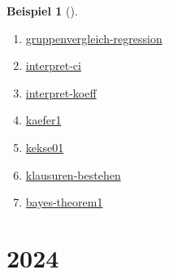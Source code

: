 \documentclass[
  ngerman,
  letterpaper,
  twoside,
  open=any]{scrbook}
\theoremstyle{definition}
\newtheorem{example}{Beispiel}[chapter]
\theoremstyle{plain}
\theoremstyle{definition}
\theoremstyle{definition}
\theoremstyle{remark}
\begin{document}
\begin{example}[]
\begin{enumerate}
\item
  \href{https://sebastiansauer.github.io/datenwerk/posts/gruppenvergleich-regression/index.html}{gruppenvergleich-regression}
\item
  \href{https://sebastiansauer.github.io/datenwerk/posts/interpret-ci/index.html}{interpret-ci}
\item
  \href{https://sebastiansauer.github.io/datenwerk/posts/interpret-koeff/interpret-koeff.html}{interpret-koeff}
\item
  \href{https://sebastiansauer.github.io/datenwerk/posts/kaefer1/kaefer1.html}{kaefer1}
\item
  \href{https://sebastiansauer.github.io/datenwerk/posts/kekse01/kekse01.html}{kekse01}
\item
  \href{https://sebastiansauer.github.io/datenwerk/posts/klausuren-bestehen/klausuren-bestehen.html}{klausuren-bestehen}
\item
  \href{https://sebastiansauer.github.io/datenwerk/posts/bayes-theorem1/bayes-theorem1.html}{bayes-theorem1}
\end{enumerate}

\section{2024}\label{section-17}


\end{example}
\end{document}

